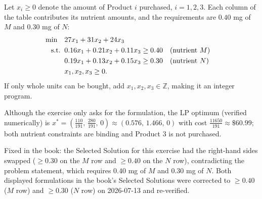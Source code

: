 Let $x_i \geq 0$ denote the amount of Product $i$ purchased, $i = 1, 2, 3$. Each column of the table contributes its nutrient amounts, and the requirements are $0.40$ mg of $M$ and $0.30$ mg of $N$:
\begin{align*}
\min \quad & 27x_1 + 31x_2 + 24x_3 \\
\text{s.t.}\;\; & 0.16x_1 + 0.21x_2 + 0.11x_3 \geq 0.40 && (\text{nutrient } M)\\
& 0.19x_1 + 0.13x_2 + 0.15x_3 \geq 0.30 && (\text{nutrient } N)\\
& x_1, x_2, x_3 \geq 0.
\end{align*}
If only whole units can be bought, add $x_1, x_2, x_3 \in \mathbb{Z}$, making it an integer program.

Although the exercise only asks for the formulation, the LP optimum (verified numerically) is $x^* = (\tfrac{110}{191},\, \tfrac{280}{191},\, 0) \approx (0.576,\, 1.466,\, 0)$ with cost $\tfrac{11650}{191} \approx \$60.99$; both nutrient constraints are binding and Product 3 is not purchased.

\begin{qaflag}
Fixed in the book: the Selected Solution for this exercise had the right-hand sides swapped ($\geq 0.30$ on the $M$ row and $\geq 0.40$ on the $N$ row), contradicting the problem statement, which requires $0.40$ mg of $M$ and $0.30$ mg of $N$. Both displayed formulations in the book's Selected Solutions were corrected to $\geq 0.40$ ($M$ row) and $\geq 0.30$ ($N$ row) on 2026-07-13 and re-verified.
\end{qaflag}

